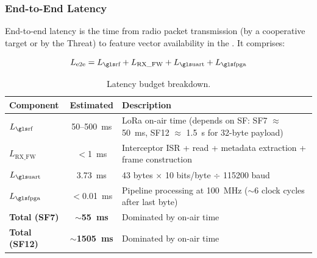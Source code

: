 \documentclass[11pt,letterpaper]{article}
\begin{document}
	\subsubsection{End-to-End Latency}

	End-to-end latency is the time from radio packet transmission (by a cooperative target or by the Threat) to feature vector availability in the \FPGA{} \BRAM{}. It comprises:

	\begin{equation}
		L_{\text{e2e}} = L_{\text{\RF{}}} + L_{\text{RX\_FW}} + L_{\text{\UART{}}} + L_{\text{\FPGA{}}}
		\label{eq:latency}
	\end{equation}

	\begin{table}[ht!]
		\centering
		\caption{Latency budget breakdown.}
		\label{tab:latency}
		\renewcommand{\arraystretch}{1.3}
		\begin{tabularx}{\textwidth}{l c X}
			\toprule
			\textbf{Component} & \textbf{Estimated} & \textbf{Description} \\
			\midrule
			$L_{\text{\RF{}}}$ & 50--500~ms & LoRa on-air time (depends on SF: SF7 $\approx$ 50~ms, SF12 $\approx$ 1.5~s for 32-byte payload) \\
			$L_{\text{RX\_FW}}$ & $<$1~ms & Interceptor ISR + \FIFO{} read + metadata extraction + frame construction \\
			$L_{\text{\UART{}}}$ & 3.73~ms & 43 bytes $\times$ 10 bits/byte $\div$ 115200 baud \\
			$L_{\text{\FPGA{}}}$ & $<$0.01~ms & Pipeline processing at 100~MHz ($\sim$6 clock cycles after last byte) \\
			\midrule
			\textbf{Total (SF7)} & $\sim$\textbf{55~ms} & Dominated by \RF{} on-air time \\
			\textbf{Total (SF12)} & $\sim$\textbf{1505~ms} & Dominated by \RF{} on-air time \\
			\bottomrule
		\end{tabularx}
	\end{table}
\end{document}
